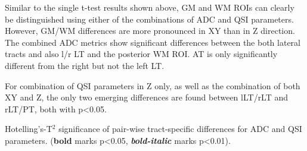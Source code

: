Similar to the single t-test results shown above, GM and WM \glspl{ROI} can clearly be distinguished using either of the combinations of \gls{ADC} and \gls{QSI} parameters. However, GM/WM differences are more pronounced in XY than in Z direction. The combined ADC metrics show significant differences between the both lateral tracts and also l/r LT and the posterior WM \gls{ROI}. AT is only significantly different from the right but not the left LT.

For combination of \gls{QSI} parameters in Z only, as well as the combination of both XY and Z, the only two emerging differences are found between lLT/rLT and rLT/PT, both with p<0.05.%

\begin{table}
  \caption{Hotelling's-T$^2$ significance of pair-wise tract-specific differences for ADC and QSI parameters. (\textbf{bold} marks p<0.05, \textbf{\emph{bold-italic}} marks p<0.01).}
  \label{tab:chap5exp1  hotelling}%


\end{table}
